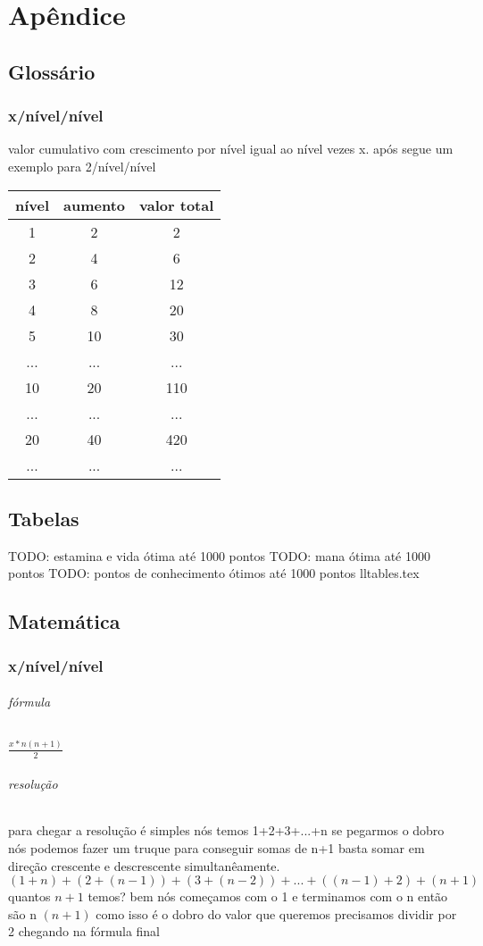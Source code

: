 \part{Apêndice}
\appendix
\chapter{Glossário}
\section{x/nível/nível}
valor cumulativo com crescimento por nível igual ao nível vezes x.
após segue um exemplo para 2/nível/nível

\begin{tabular}[c]{c|c|c}
\hline
  nível & aumento & valor total  \\
\hline
  1   & 2   & 2   \\
  2   & 4   & 6   \\
  3   & 6   & 12  \\
  4   & 8   & 20  \\
  5   & 10  & 30  \\
  ... & ... & ... \\
  10  & 20  & 110 \\ 
  ... & ... & ... \\
  20  & 40  & 420 \\
  ... & ... & ... \\
\hline
\end{tabular}

\chapter{Tabelas}
TODO: estamina e vida ótima até 1000 pontos
TODO: mana ótima até 1000 pontos
TODO: pontos de conhecimento ótimos até 1000 pontos
{lltables.tex}

\chapter{Matemática}
\section{x/nível/nível}
\paragraph{fórmula} \(\frac{x*n(n+1)}{2}\)
\paragraph{resolução} para chegar a resolução é simples nós temos 1+2+3+...+n
se pegarmos o dobro nós podemos fazer um truque para conseguir somas de n+1 basta somar em direção crescente e descrescente simultanêamente.
\((1+n) + (2 + (n-1)) + (3 + (n-2))+ ... +((n-1)+2) + (n+1)\)
quantos \(n+1\) temos? bem nós começamos com o 1 e terminamos com o n
então são n \((n+1)\) como isso é o dobro do valor que queremos precisamos dividir por 2 chegando na fórmula final 
%
%
%
%
